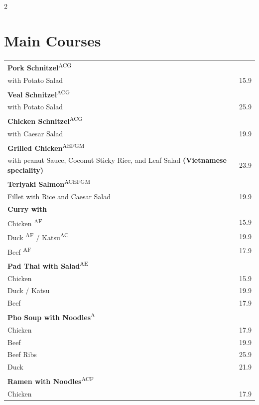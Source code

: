 \documentclass[a4paper,12pt]{article}
\begin{document}
\begin{multicols}{2}
\section*{Main Courses}
\begin{tabular}{p{6cm}r}
\textbf{Pork Schnitzel}\textsuperscript{{\scriptsize ACG}}\\
\scriptsize  with Potato Salad & 15.9\\
\textbf{Veal Schnitzel}\textsuperscript{{\scriptsize ACG}}\\
\scriptsize  with Potato Salad & 25.9\\
\textbf{Chicken Schnitzel}\textsuperscript{{\scriptsize ACG}}\\
\scriptsize  with Caesar Salad & 19.9\\
\textbf{Grilled Chicken}\textsuperscript{{\scriptsize AEFGM}}\\
\scriptsize with peanut Sauce, Coconut Sticky Rice, and Leaf Salad \textbf{(Vietnamese speciality)} & 23.9\\
\textbf{Teriyaki Salmon}\textsuperscript{{\scriptsize ACEFGM}}\\
\scriptsize Fillet with Rice and Caesar Salad & 19.9\\
\textbf{Curry with}\\
\qquad Chicken \textsuperscript{{\scriptsize AF}} & 15.9\\
\qquad Duck \textsuperscript{{\scriptsize AF}} / Katsu\textsuperscript{{\scriptsize AC}} & 19.9\\
\qquad Beef \textsuperscript{{\scriptsize AF}} & 17.9\\
\textbf{Pad Thai with Salad}\textsuperscript{{\scriptsize AE}}\\
\qquad Chicken & 15.9\\
\qquad Duck / Katsu & 19.9\\
\qquad Beef & 17.9\\
\textbf{Pho Soup with Noodles}\textsuperscript{{\scriptsize A}}\\
\qquad Chicken & 17.9\\
\qquad Beef & 19.9\\
\qquad Beef Ribs & 25.9\\
\qquad Duck & 21.9\\
\textbf{Ramen with Noodles}\textsuperscript{{\scriptsize ACF}}\\
\qquad Chicken & 17.9\\

\end{tabular}
\end{multicols}
\end{document}
